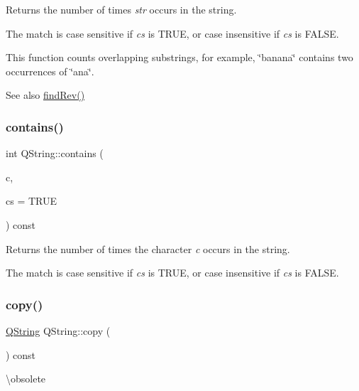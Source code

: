 Returns the number of times {\itshape str} occurs in the string.

The match is case sensitive if {\itshape cs} is T\+R\+UE, or case insensitive if {\itshape cs} is F\+A\+L\+SE.

This function counts overlapping substrings, for example, \char`\"{}banana\char`\"{} contains two occurrences of \char`\"{}ana\char`\"{}.

\begin{DoxySeeAlso}{See also}
\mbox{\hyperlink{class_q_string_a97b5c9712f3f145d52f91d816763ceea}{find\+Rev()}} 
\end{DoxySeeAlso}
\mbox{\label{class_q_string_addd0afccd10afee3a1b42ceaaf3206b8}} 
\subsubsection{\texorpdfstring{contains()}{contains()}\hspace{0.1cm}{\footnotesize\ttfamily [5/5]}}
{\footnotesize\ttfamily int Q\+String\+::contains (\begin{DoxyParamCaption}\item[{\mbox{\hyperlink{class_q_char}{Q\+Char}}}]{c,  }\item[{bool}]{cs = {\ttfamily TRUE} }\end{DoxyParamCaption}) const}

Returns the number of times the character {\itshape c} occurs in the string.

The match is case sensitive if {\itshape cs} is T\+R\+UE, or case insensitive if {\itshape cs} is F\+A\+L\+SE. \mbox{\label{class_q_string_a235ce7da570a43b49839a1cd00c91936}} 
\subsubsection{\texorpdfstring{copy()}{copy()}}
{\footnotesize\ttfamily \mbox{\hyperlink{class_q_string}{Q\+String}} Q\+String\+::copy (\begin{DoxyParamCaption}{ }\end{DoxyParamCaption}) const\hspace{0.3cm}{\ttfamily [inline]}}

\textbackslash{}obsolete

